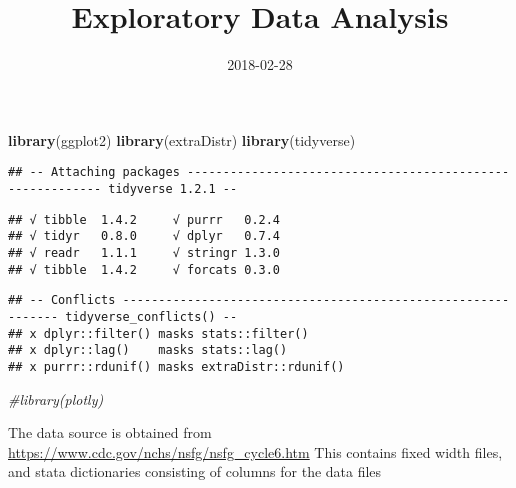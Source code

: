 \documentclass[]{article}
\title{Exploratory Data Analysis}
\author{}
\date{2018-02-28}
\newenvironment{Shaded}{\begin{snugshade}}{\end{snugshade}}
\newcommand{\KeywordTok}[1]{\textcolor[rgb]{0.13,0.29,0.53}{\textbf{#1}}}
\newcommand{\CommentTok}[1]{\textcolor[rgb]{0.56,0.35,0.01}{\textit{#1}}}
\newcommand{\NormalTok}[1]{#1}
\begin{document}
\maketitle

\begin{Shaded}
\begin{Highlighting}[]
\KeywordTok{library}\NormalTok{(ggplot2)}
\KeywordTok{library}\NormalTok{(extraDistr)}
\KeywordTok{library}\NormalTok{(tidyverse)}
\end{Highlighting}
\end{Shaded}

\begin{verbatim}
## -- Attaching packages ---------------------------------------------------------- tidyverse 1.2.1 --
\end{verbatim}

\begin{verbatim}
## √ tibble  1.4.2     √ purrr   0.2.4
## √ tidyr   0.8.0     √ dplyr   0.7.4
## √ readr   1.1.1     √ stringr 1.3.0
## √ tibble  1.4.2     √ forcats 0.3.0
\end{verbatim}

\begin{verbatim}
## -- Conflicts ------------------------------------------------------------- tidyverse_conflicts() --
## x dplyr::filter() masks stats::filter()
## x dplyr::lag()    masks stats::lag()
## x purrr::rdunif() masks extraDistr::rdunif()
\end{verbatim}

\begin{Shaded}
\begin{Highlighting}[]
\CommentTok{#library(plotly)}
\end{Highlighting}
\end{Shaded}

The data source is obtained from
\url{https://www.cdc.gov/nchs/nsfg/nsfg_cycle6.htm} This contains fixed
width files, and stata dictionaries consisting of columns for the data
files
\end{document}
